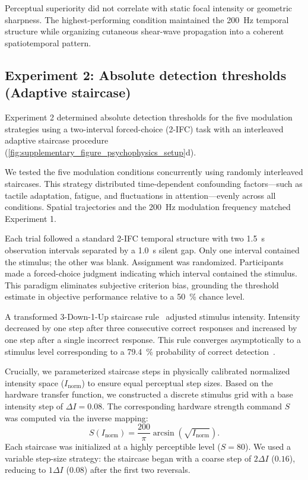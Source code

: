 \documentclass[pdflatex, sn-nature]{sn-jnl}
\theoremstyle{thmstyleone}%
\theoremstyle{thmstyletwo}%
\theoremstyle{thmstylethree}%
\begin{document}
Perceptual superiority did not correlate with static focal intensity or geometric sharpness. The highest-performing condition maintained the \qty{200}{\hertz} temporal structure while organizing cutaneous shear-wave propagation into a coherent spatiotemporal pattern.

\subsection*{Experiment 2: Absolute detection thresholds (Adaptive staircase)}
\label{sec:experiment_2_absolute_detection_thresholds}

Experiment 2 determined absolute detection thresholds for the five modulation strategies using a two-interval forced-choice (2-IFC) task with an interleaved adaptive staircase procedure~\citep{leekAdaptiveProceduresPsychophysical2001} (\cref{fig:supplementary_figure_psychophysics_setup}d).

We tested the five modulation conditions concurrently using randomly interleaved staircases. This strategy distributed time-dependent confounding factors---such as tactile adaptation, fatigue, and fluctuations in attention---evenly across all conditions. Spatial trajectories and the \qty{200}{\hertz} modulation frequency matched Experiment 1.

Each trial followed a standard 2-IFC temporal structure with two \qty{1.5}{\second} observation intervals separated by a \qty{1.0}{\second} silent gap. Only one interval contained the stimulus; the other was blank. Assignment was randomized. Participants made a forced-choice judgment indicating which interval contained the stimulus. This paradigm eliminates subjective criterion bias, grounding the threshold estimate in objective performance relative to a \qty{50}{\percent} chance level.

A transformed 3-Down-1-Up staircase rule~\citep{levittTransformedUpdownMethods1971} adjusted stimulus intensity. Intensity decreased by one step after three consecutive correct responses and increased by one step after a single incorrect response. This rule converges asymptotically to a stimulus level corresponding to a \qty{79.4}{\percent} probability of correct detection~\citep{levittTransformedUpdownMethods1971, garcia-perezForcedchoiceStaircasesFixed1998a}.

Crucially, we parameterized staircase steps in physically calibrated normalized intensity space ($I_{\mathrm{norm}}$) to ensure equal perceptual step sizes. Based on the hardware transfer function, we constructed a discrete stimulus grid with a base intensity step of $\Delta I = 0.08$. The corresponding hardware strength command $S$ was computed via the inverse mapping:
\begin{equation}
    S(I_{\mathrm{norm}}) = \frac{200}{\pi} \arcsin\left(\sqrt{I_{\mathrm{norm}}}\right).
\end{equation}
Each staircase was initialized at a highly perceptible level ($S = 80$). We used a variable step-size strategy: the staircase began with a coarse step of $2\Delta I$ ($0.16$), reducing to $1\Delta I$ ($0.08$) after the first two reversals.
\end{document}
